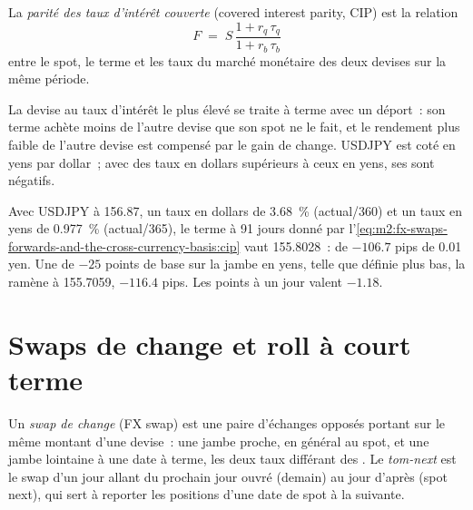 \begin{definition}\label{def:m2:fx-swaps-forwards-and-the-cross-currency-basis:cip}
La \emph{parité des taux d'intérêt couverte} (covered interest parity, CIP) est la
relation
\begin{equation}\label{eq:m2:fx-swaps-forwards-and-the-cross-currency-basis:cip}
F \;=\; S\,\frac{1 + r_q\,\tau_q}{1 + r_b\,\tau_b}
\end{equation}
entre le spot, le terme et les taux du marché monétaire des deux devises sur la
même période.
\end{definition}

La devise au taux d'intérêt le plus élevé se traite à terme avec un déport~: son
terme achète moins de l'autre devise que son spot ne le fait, et le rendement plus faible de
l'autre devise est compensé par le gain de change. USDJPY est coté en yens par
dollar~; avec des taux en dollars supérieurs à ceux en yens, ses  sont
négatifs.

\begin{example}\label{ex:m2:fx-swaps-forwards-and-the-cross-currency-basis:fwd}
Avec USDJPY à 156.87, un taux en dollars de 3.68~\% (actual/360) et un taux en yens de
0.977~\% (actual/365), le terme à 91 jours donné par l'\cref{eq:m2:fx-swaps-forwards-and-the-cross-currency-basis:cip}
vaut 155.8028~:  de $-106.7$ pips de 0.01 yen. Une  de $-25$ points
de base sur la jambe en yens, telle que définie plus bas, la ramène à 155.7059, $-116.4$ pips.
Les points  à un jour valent $-1.18$.
\end{example}

\section{Swaps de change et roll à court terme}

\begin{definition}\label{def:m2:fx-swaps-forwards-and-the-cross-currency-basis:swap}
Un \emph{swap de change} (FX swap) est une paire d'échanges opposés portant sur le même
montant d'une devise~: une jambe proche, en général au spot, et une jambe lointaine à une date à terme,
les deux taux différant des . Le \emph{tom-next}
est le swap d'un jour allant du prochain jour ouvré (demain) au jour d'après
(spot next), qui sert à reporter les positions d'une date de spot à la suivante.
\end{definition}

